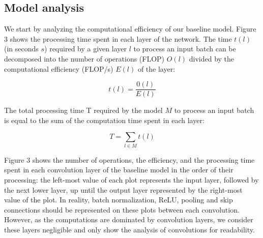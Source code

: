 \documentclass[runningheads]{llncs}
\begin{document}
\subsection{Model analysis}

We start by analyzing the computational efficiency of our baseline model.
Figure 3 shows the processing time spent in each layer of the network.
The time $t(l)$ (in seconds $s$) required by a given layer $l$ to process an input batch 
can be decomposed into the number of operations (FLOP) $O(l)$ divided by the computational efficiency (FLOP/s) $E(l)$ of the layer:

$$t(l) = \frac{0(l)}{E(l)} $$

The total processing time T required by the model $M$ to process an input batch 
is equal to the sum of the computation time spent in each layer:

$$T = \sum_{l \in M} t(l)$$

Figure 3 shows the number of operations, the efficiency, and the processing time spent in each convolution layer of the baseline model in the order of their processing: 
the left-most value of each plot represents the input layer, followed by the next lower layer, up until the output layer represented by the right-most value of the plot.
In reality, batch normalization, ReLU, pooling and skip connections should be represented on these plots between each convolution.
However, as the computations are dominated by convolution layers, we consider these layers negligible and only show the analysis of convolutions for readability. 
\end{document}
